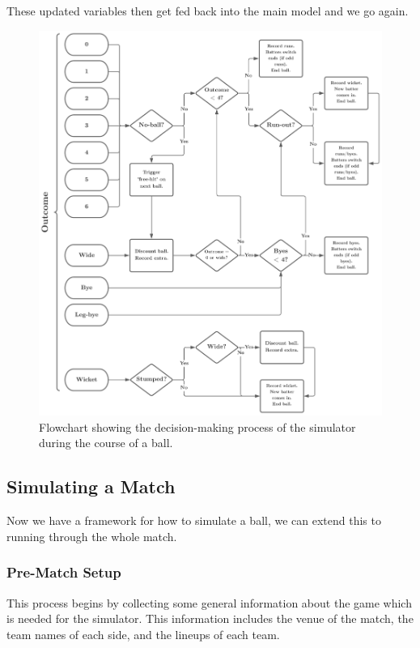 These updated variables then get fed back into the main model and we go again.

\begin{figure}
    \centering
    \includegraphics[width=1\columnwidth]{images/cricket flowchart (2).png}
    \caption{Flowchart showing the decision-making process of the simulator during the course of a ball.}
    \label{fig: flowchart}
\end{figure}

\subsection{Simulating a Match}
\label{subsec: sim match}

Now we have a framework for how to simulate a ball, we can extend this to running through the whole match. 

\subsubsection{Pre-Match Setup}

This process begins by collecting some general information about the game which is needed for the simulator. This information includes the venue of the match, the team names of each side, and the lineups of each team. 

